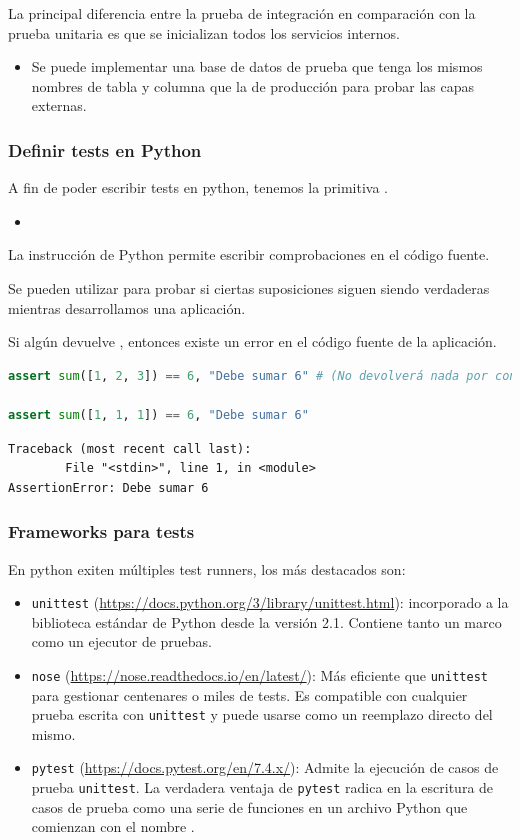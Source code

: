 La principal diferencia entre la prueba de integración en comparación con la prueba unitaria es que se inicializan todos los servicios internos. 

\begin{itemize}
	\item Se puede implementar una base de datos de prueba que tenga los mismos nombres de tabla y columna que la de producción para probar las capas externas. 
\end{itemize}
\subsubsection{Definir tests en Python}

A fin de poder escribir tests en python, tenemos  la primitiva .
\begin{itemize}
	\item {}
\end{itemize}
La instrucción  de Python permite escribir comprobaciones en el código fuente. 

Se pueden utilizar para probar si ciertas suposiciones siguen siendo verdaderas mientras desarrollamos una aplicación. 

Si algún  devuelve , entonces existe un error en el código fuente de la aplicación.

\begin{lstlisting}[language=python]
assert sum([1, 2, 3]) == 6, "Debe sumar 6" # (No devolverá nada por consola)

assert sum([1, 1, 1]) == 6, "Debe sumar 6"
\end{lstlisting}
\begin{verbatim}
Traceback (most recent call last):
		File "<stdin>", line 1, in <module>
AssertionError: Debe sumar 6
\end{verbatim}
\subsubsection{Frameworks para tests}
En python exiten múltiples test runners, los más destacados son:
\begin{itemize}
\item \texttt{unittest} (\url{https://docs.python.org/3/library/unittest.html}): incorporado a la biblioteca estándar de Python desde la versión 2.1. Contiene tanto un marco  como un ejecutor de pruebas.
\item \texttt{nose} (\url{https://nose.readthedocs.io/en/latest/}): Más eficiente que \texttt{unittest} para gestionar centenares o miles de tests. Es compatible con cualquier prueba escrita con \texttt{unittest} y puede usarse como un reemplazo directo del mismo.
\item \texttt{pytest} (\url{https://docs.pytest.org/en/7.4.x/}): Admite la ejecución de casos de prueba \texttt{unittest}. La verdadera ventaja de \texttt{pytest} radica en la escritura de casos de prueba como una serie de funciones en un archivo Python que comienzan con el nombre .
\end{itemize}

